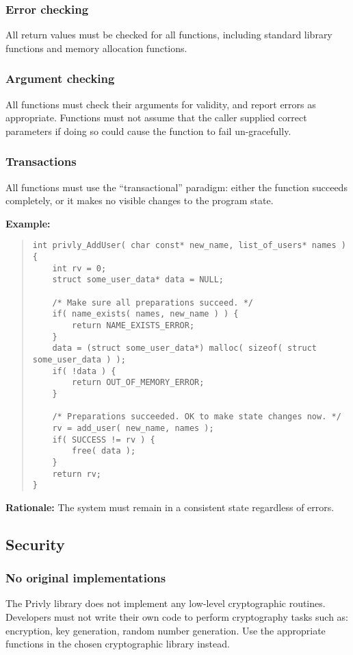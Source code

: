 \documentclass[]{article}
\begin{document}
\subsubsection{Error checking}
All return values must be checked for all functions, including standard library functions and memory allocation functions.

\subsubsection{Argument checking}
All functions must check their arguments for validity, and report errors as appropriate. Functions must not assume that the caller supplied correct parameters if doing so could cause the function to fail un-gracefully.

\subsubsection{Transactions}
All functions must use the ``transactional'' paradigm: either the function succeeds completely, or it makes no visible changes to the program state.

\textbf{Example:}
\begin{quote} \begin{verbatim}
int privly_AddUser( char const* new_name, list_of_users* names )
{
    int rv = 0;
    struct some_user_data* data = NULL;
    
    /* Make sure all preparations succeed. */
    if( name_exists( names, new_name ) ) {
        return NAME_EXISTS_ERROR;
    }
    data = (struct some_user_data*) malloc( sizeof( struct some_user_data ) );
    if( !data ) {
        return OUT_OF_MEMORY_ERROR;
    }
    
    /* Preparations succeeded. OK to make state changes now. */
    rv = add_user( new_name, names );
    if( SUCCESS != rv ) {
        free( data );
    }
    return rv;
}
\end{verbatim} \end{quote}

\textbf{Rationale:} The system must remain in a consistent state regardless of errors.


\subsection{Security}

\subsubsection{No original implementations}
The Privly library does not implement any low-level cryptographic routines. Developers must not write their own code to perform cryptography tasks such as: encryption, key generation, random number generation. Use the appropriate functions in the chosen cryptographic library instead.
\end{document}
